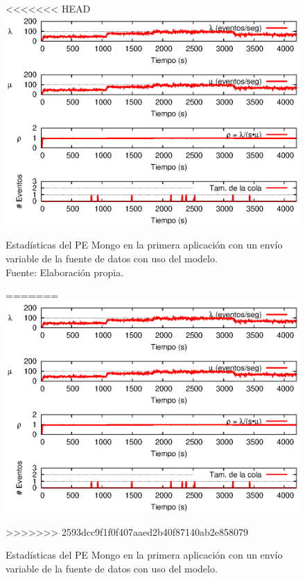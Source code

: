 \begin{figure}[!ht]
<<<<<<< HEAD
    \centering
    \captionsetup{justification=centering}
    \includegraphics[scale=1]{images/exp/app1/normal/cm/statusMongoPE.eps}
    \caption[Estadísticas del PE Mongo en la primera aplicación con un envío variable de la fuente de datos con uso del modelo.]{Estadísticas del PE Mongo en la primera aplicación con un envío variable de la fuente de datos con uso del modelo.\\Fuente: Elaboración propia.}
=======
\centering
    \includegraphics[scale=1.1]{images/exp/app1/normal/cm/statusMongoPE.eps}
    \caption{Estad\'isticas del PE Mongo en la primera aplicaci\'on con un env\'io variable de la fuente de datos con uso del modelo.}
>>>>>>> 2593dcc9f1f0f407aaed2b40f87140ab2e858079
    \label{fig:app1-normal-statusMongoPE-cm}
\end{figure}

